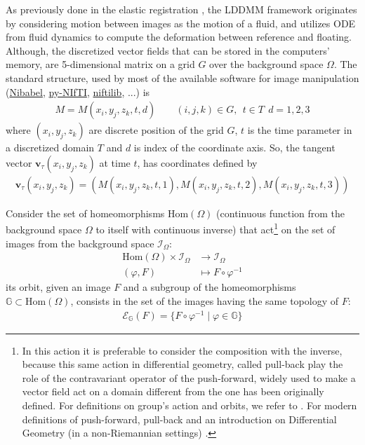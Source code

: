As previously done in the elastic registration \cite{Broit:1981}, the LDDMM framework \cite{beg2005computing} originates by considering motion between images as the motion of a fluid, and utilizes ODE from fluid dynamics to compute the deformation between reference and floating. 
Although, the discretized vector fields that can be stored in the computers' memory, are 5-dimensional matrix on a grid $G$ over the background space $\Omega$. The standard structure, used by most of the available software for image manipulation (\href{http://nipy.org/nibabel/}{Nibabel}, \href{http://niftilib.sourceforge.net/pynifti/intro.html}{py-NIfTI}, \href{http://niftilib.sourceforge.net/}{niftilib}, ...) is 
\begin{align*}
M = M(x_i,y_j,z_k,t,d) \qquad (i,j,k)\in G , ~~ t \in T  ~~ d = 1,2,3
\end{align*}
where $(x_i,y_j,z_k)$ are discrete position of the grid $G$, $t$ is the time parameter in a discretized domain $T$ and $d$ is index of the coordinate axis. So, the tangent vector $\mathbf{v}_{\tau}(x_i,y_j,z_k)$ at time $t$, has coordinates defined by
\begin{align*}
\mathbf{v}_{\tau}(x_i,y_j,z_k) = (M(x_i,y_j,z_k,t ,1), M(x_i,y_j,z_k,t,2), M(x_i,y_j,z_k,t ,3))
\end{align*}

Consider the set of homeomorphisms $\text{Hom}(\Omega)$ (continuous function from the background space $\Omega$ to itself with continuous inverse) that act\footnote{In this action it is preferable to consider the composition with the inverse, because this same action in differential geometry, called pull-back play the role of the contravariant operator of the push-forward, widely used to make a vector field act on a domain different from the one has been originally defined. For definitions on group's action and orbits, we refer to \cite{artin2011algebra}. For modern definitions of push-forward, pull-back and an introduction on Differential Geometry (in a non-Riemannian settings) \cite{lee2012introduction}.} on the set of images from the background space $\mathcal{I}_{\Omega}$:
\begin{align*}
\text{Hom}(\Omega) \times \mathcal{I}_{\Omega} & \longrightarrow  \mathcal{I}_{\Omega}   \\
(\varphi,F) &\longmapsto F\circ \varphi^{-1}
\end{align*}
its orbit, given an image $F$ and a subgroup of the homeomorphisms $\mathbb{G}\subset \text{Hom}(\Omega)$, consists in the set of the images having the same topology of $F$: 
\begin{align*}
\mathcal{E}_{\mathbb{G}}(F) = \{ F\circ \varphi^{-1} \mid \varphi \in \mathbb{G} \}
\end{align*}

